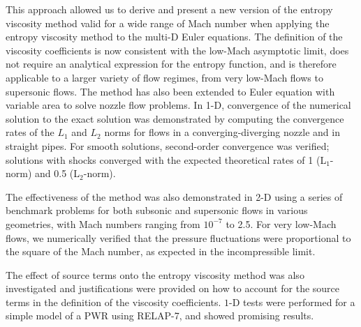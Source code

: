 This approach allowed us to derive and present a new version of the entropy viscosity method valid for a wide range of Mach number when applying the entropy viscosity method to the multi-D Euler equations. The definition of the viscosity coefficients
is now consistent with the low-Mach asymptotic limit, does not require an analytical expression 
for the entropy function, and is therefore applicable to a larger variety of flow regimes, from very 
low-Mach flows to supersonic flows. 
The method has also been extended to Euler equation with variable area to solve nozzle flow problems.
In 1-D, convergence of the numerical solution to 
the exact solution was demonstrated by computing the convergence rates of the $L_1$ and $L_2$ norms 
for flows in a converging-diverging nozzle and in straight pipes. For smooth solutions, second-order 
convergence was verified; solutions with shocks converged with the expected theoretical rates of 1 (L$_1$-norm)
and 0.5 (L$_2$-norm).

The effectiveness of the method was also demonstrated in 2-D using a series of benchmark problems
for both subsonic and supersonic flows in various geometries, with Mach numbers ranging from $10^{-7}$ to 
2.5. For very low-Mach flows, we numerically verified that the pressure fluctuations were proportional to 
the square of the Mach number, as expected in the incompressible limit.

The effect of source terms onto the entropy viscosity method was also investigated and justifications were provided on how to account for the source terms in the definition of the viscosity coefficients. $1$-D tests were performed for a simple model of a PWR using RELAP-7, and showed promising results.

